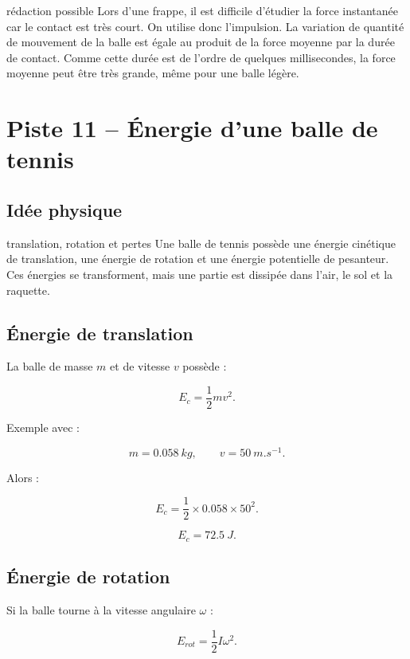 \documentclass[11pt,a4paper]{article}
\begin{document}
\begin{oral}{rédaction possible}
Lors d'une frappe, il est difficile d'étudier la force instantanée car le contact est très court. On utilise donc l'impulsion. La variation de quantité de mouvement de la balle est égale au produit de la force moyenne par la durée de contact. Comme cette durée est de l'ordre de quelques millisecondes, la force moyenne peut être très grande, même pour une balle légère.
\end{oral}

\section{Piste 11 -- Énergie d'une balle de tennis}

\subsection{Idée physique}

\begin{idee}{translation, rotation et pertes}
Une balle de tennis possède une énergie cinétique de translation, une énergie de rotation et une énergie potentielle de pesanteur. Ces énergies se transforment, mais une partie est dissipée dans l'air, le sol et la raquette.
\end{idee}

\subsection{Énergie de translation}

La balle de masse $m$ et de vitesse $v$ possède :

\[
E_c=\frac12mv^2.
\]

Exemple avec :

\[
m=\SI{0.058}{kg},
\qquad
v=\SI{50}{m.s^{-1}}.
\]

Alors :

\[
E_c=\frac12\times 0.058\times 50^2.
\]

\[
E_c=72.5\ \si{J}.
\]

\subsection{Énergie de rotation}

Si la balle tourne à la vitesse angulaire $\omega$ :

\[
E_{rot}=\frac12I\omega^2.
\]
\end{document}
